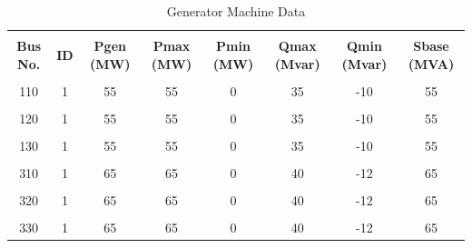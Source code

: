 \documentclass[paper=a4, fontsize=11pt]{article}
\begin{document}
\begin{landscape}

\begin{table}[t]
\caption{Generator Machine Data}
\centering
\begin{tabular}{|c|c|c|c|c|c|c|c|}
\hline &&&&&&&\\[-1em]
\textbf{Bus No.} & \textbf{ID} & \textbf{Pgen (MW)} & \textbf{Pmax (MW)} & \textbf{Pmin (MW)} & \textbf{Qmax (Mvar)} & \textbf{Qmin (Mvar)} & \textbf{Sbase (MVA)} \\ \hline &&&&&&&\\[-1em]
110              & 1           & 55                 & 55                 & 0                  & 35                   & -10                  & 55                   \\ \hline &&&&&&&\\[-1em]
120              & 1           & 55                 & 55                 & 0                  & 35                   & -10                  & 55                   \\ \hline &&&&&&&\\[-1em]
130              & 1           & 55                 & 55                 & 0                  & 35                   & -10                  & 55                   \\ \hline &&&&&&&\\[-1em]
310              & 1           & 65                 & 65                 & 0                  & 40                   & -12                  & 65                   \\ \hline &&&&&&&\\[-1em]
320              & 1           & 65                 & 65                 & 0                  & 40                   & -12                  & 65                   \\ \hline &&&&&&&\\[-1em]
330              & 1           & 65                 & 65                 & 0                  & 40                   & -12                  & 65                   \\ \hline
\end{tabular}
\end{table}


\end{landscape}
\end{document}
